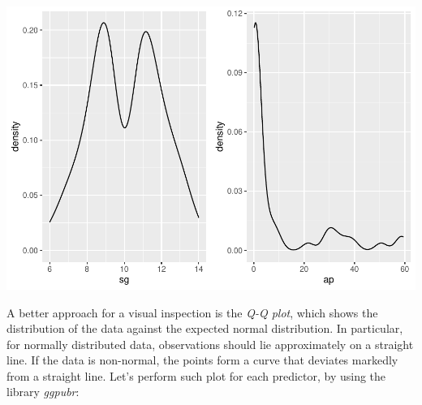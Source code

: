 \documentclass[
]{article}
\begin{document}
\includegraphics{clustering_files/figure-latex/unnamed-chunk-26-4.pdf}

A better approach for a visual inspection is the \emph{Q-Q plot}, which
shows the distribution of the data against the expected normal
distribution. In particular, for normally distributed data, observations
should lie approximately on a straight line. If the data is non-normal,
the points form a curve that deviates markedly from a straight line.
Let's perform such plot for each predictor, by using the library
\emph{ggpubr}:
\end{document}
